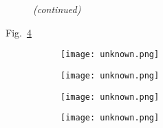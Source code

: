 \begin{figure}[htbp]
    \centering
    \quad
    \caption[]{}\label{fig:add_label}
\end{figure}
\begin{figure}[htbp]
\ContinuedFloat
    \centering
    \quad
    \captionsetup{list=no}
    \caption{\emph{(continued)}}
\end{figure}
Fig.~\ref{fig:add_label}
\begin{figure}
    \centering
    \begin{subfigure}[t]{\textwidth}
          \begin{minipage}[t]{0.49\linewidth}
            \centering
            \texttt{[image: unknown.png]}
          \end{minipage}
          \hspace{0.02\linewidth}
          \begin{minipage}[t]{0.49\linewidth}
            \centering
            \texttt{[image: unknown.png]}
          \end{minipage}
        \caption{}\label{fig:add_label}
    \end{subfigure}
    \par\bigskip
    \begin{subfigure}[t]{\textwidth}
          \begin{minipage}[t]{0.49\linewidth}
            \centering
            \texttt{[image: unknown.png]}
          \end{minipage}
          \hspace{0.02\linewidth}
          \begin{minipage}[t]{0.49\linewidth}
            \centering
            \texttt{[image: unknown.png]}
          \end{minipage}
        \caption{}\label{fig:add_label}
    \end{subfigure}
    \caption[]{}\label{fig:add_label}
\end{figure}

